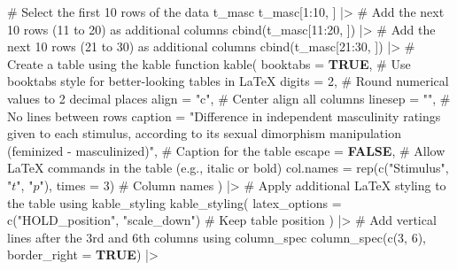 \documentclass[
  bookmarksnumbered]{article}
\newenvironment{Shaded}{\begin{snugshade}}{\end{snugshade}}
\newcommand{\AttributeTok}[1]{\textcolor[rgb]{0.80,0.80,0.80}{#1}}
\newcommand{\CommentTok}[1]{\textcolor[rgb]{0.50,0.62,0.50}{#1}}
\newcommand{\ConstantTok}[1]{\textcolor[rgb]{0.86,0.64,0.64}{\textbf{#1}}}
\newcommand{\DecValTok}[1]{\textcolor[rgb]{0.86,0.86,0.80}{#1}}
\newcommand{\FunctionTok}[1]{\textcolor[rgb]{0.94,0.94,0.56}{#1}}
\newcommand{\NormalTok}[1]{\textcolor[rgb]{0.80,0.80,0.80}{#1}}
\newcommand{\SpecialCharTok}[1]{\textcolor[rgb]{0.86,0.64,0.64}{#1}}
\newcommand{\StringTok}[1]{\textcolor[rgb]{0.80,0.58,0.58}{#1}}
\begin{document}
\begin{Shaded}
\begin{Highlighting}[]
\CommentTok{\# Select the first 10 rows of the data \textquotesingle{}t\_masc\textquotesingle{}}
\NormalTok{t\_masc[}\DecValTok{1}\SpecialCharTok{:}\DecValTok{10}\NormalTok{, ] }\SpecialCharTok{|\textgreater{}}
  \CommentTok{\# Add the next 10 rows (11 to 20) as additional columns}
  \FunctionTok{cbind}\NormalTok{(t\_masc[}\DecValTok{11}\SpecialCharTok{:}\DecValTok{20}\NormalTok{, ]) }\SpecialCharTok{|\textgreater{}}
  \CommentTok{\# Add the next 10 rows (21 to 30) as additional columns}
  \FunctionTok{cbind}\NormalTok{(t\_masc[}\DecValTok{21}\SpecialCharTok{:}\DecValTok{30}\NormalTok{, ]) }\SpecialCharTok{|\textgreater{}}
  \CommentTok{\# Create a table using the \textquotesingle{}kable\textquotesingle{} function}
  \FunctionTok{kable}\NormalTok{(}
    \AttributeTok{booktabs =} \ConstantTok{TRUE}\NormalTok{, }\CommentTok{\# Use \textquotesingle{}booktabs\textquotesingle{} style for better{-}looking tables in LaTeX}
    \AttributeTok{digits =} \DecValTok{2}\NormalTok{, }\CommentTok{\# Round numerical values to 2 decimal places}
    \AttributeTok{align =} \StringTok{"c"}\NormalTok{, }\CommentTok{\# Center align all columns}
    \AttributeTok{linesep =} \StringTok{""}\NormalTok{, }\CommentTok{\# No lines between rows}
    \AttributeTok{caption =} \StringTok{"Difference in independent masculinity ratings given to each stimulus,}
\StringTok{               according to its sexual dimorphism manipulation (feminized {-} masculinized)"}\NormalTok{,}
    \CommentTok{\# Caption for the table}
    \AttributeTok{escape =} \ConstantTok{FALSE}\NormalTok{, }\CommentTok{\# Allow LaTeX commands in the table (e.g., italic or bold)}
    \AttributeTok{col.names =} \FunctionTok{rep}\NormalTok{(}\FunctionTok{c}\NormalTok{(}\StringTok{"Stimulus"}\NormalTok{, }\StringTok{"$t$"}\NormalTok{, }\StringTok{"$p$"}\NormalTok{), }\AttributeTok{times =} \DecValTok{3}\NormalTok{) }\CommentTok{\# Column names}
\NormalTok{  ) }\SpecialCharTok{|\textgreater{}}
  \CommentTok{\# Apply additional LaTeX styling to the table using \textquotesingle{}kable\_styling\textquotesingle{}}
  \FunctionTok{kable\_styling}\NormalTok{(}
    \AttributeTok{latex\_options =} \FunctionTok{c}\NormalTok{(}\StringTok{"HOLD\_position"}\NormalTok{, }\StringTok{"scale\_down"}\NormalTok{) }\CommentTok{\# Keep table position}
\NormalTok{  ) }\SpecialCharTok{|\textgreater{}}
  \CommentTok{\# Add vertical lines after the 3rd and 6th columns using \textquotesingle{}column\_spec\textquotesingle{}}
  \FunctionTok{column\_spec}\NormalTok{(}\FunctionTok{c}\NormalTok{(}\DecValTok{3}\NormalTok{, }\DecValTok{6}\NormalTok{), }\AttributeTok{border\_right =} \ConstantTok{TRUE}\NormalTok{) }\SpecialCharTok{|\textgreater{}}

\end{Highlighting}
\end{Shaded}
\end{document}

